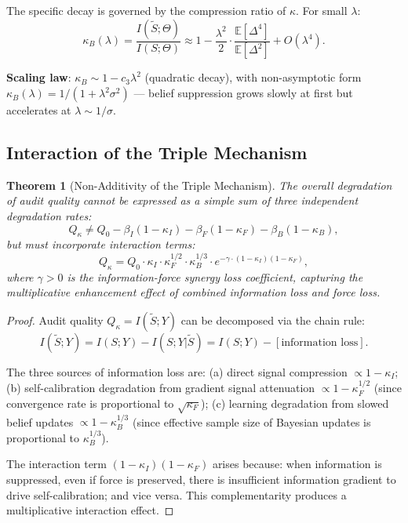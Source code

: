 \documentclass[12pt,a4paper]{article}
\newtheorem{theorem}{Theorem}[section]
\theoremstyle{definition}
\newcommand{\E}{\mathbb{E}}
\begin{document}
The specific decay is governed by the compression ratio of $\kappa$. For small $\lambda$:
\begin{equation}
    \kappa_B(\lambda) = \frac{I(\tilde{S}; \Theta)}{I(S; \Theta)} \approx 1 - \frac{\lambda^2}{2} \cdot \frac{\E[\Delta^4]}{\E[\Delta^2]} + O(\lambda^4).
\end{equation}

\textbf{Scaling law}: $\kappa_B \sim 1 - c_3\lambda^2$ (quadratic decay), with non-asymptotic form $\kappa_B(\lambda) = 1/(1 + \lambda^2\sigma^2)$ --- belief suppression grows slowly at first but accelerates at $\lambda \sim 1/\sigma$.

\subsection{Interaction of the Triple Mechanism}
\label{sec:interaction}

\begin{theorem}[Non-Additivity of the Triple Mechanism]
\label{thm:nonadditive}
The overall degradation of audit quality cannot be expressed as a simple sum of three independent degradation rates:
\begin{equation}
    Q_\kappa \neq Q_0 - \beta_I(1-\kappa_I) - \beta_F(1-\kappa_F) - \beta_B(1-\kappa_B),
\end{equation}
but must incorporate interaction terms:
\begin{equation}
    Q_\kappa = Q_0 \cdot \kappa_I \cdot \kappa_F^{1/2} \cdot \kappa_B^{1/3} \cdot e^{-\gamma \cdot (1-\kappa_I)(1-\kappa_F)},
\end{equation}
where $\gamma > 0$ is the information-force synergy loss coefficient, capturing the multiplicative enhancement effect of combined information loss and force loss.
\end{theorem}

\begin{proof}
Audit quality $Q_\kappa = I(\tilde{S}; Y)$ can be decomposed via the chain rule:
\begin{equation}
    I(\tilde{S}; Y) = I(S; Y) - I(S; Y|\tilde{S}) = I(S; Y) - [\text{information loss}].
\end{equation}

The three sources of information loss are: (a) direct signal compression $\propto 1-\kappa_I$; (b) self-calibration degradation from gradient signal attenuation $\propto 1-\kappa_F^{1/2}$ (since convergence rate is proportional to $\sqrt{\kappa_F}$); (c) learning degradation from slowed belief updates $\propto 1-\kappa_B^{1/3}$ (since effective sample size of Bayesian updates is proportional to $\kappa_B^{1/3}$).

The interaction term $(1-\kappa_I)(1-\kappa_F)$ arises because: when information is suppressed, even if force is preserved, there is insufficient information gradient to drive self-calibration; and vice versa. This complementarity produces a multiplicative interaction effect.
\end{proof}
\end{document}
